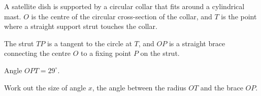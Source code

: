 \documentclass[11pt]{article}
\begin{document}
\begin{question}
\noindent A satellite dish is supported by a circular collar that fits around a cylindrical mast. $O$ is the centre of the circular cross-section of the collar, and $T$ is the point where a straight support strut touches the collar.

The strut $TP$ is a tangent to the circle at $T$, and $OP$ is a straight brace connecting the centre $O$ to a fixing point $P$ on the strut.

\begin{center}
\end{center}

\noindent Angle $OPT = 29^\circ$.

Work out the size of angle $x$, the angle between the radius $OT$ and the brace $OP$.
\vspace{4.5cm}
\end{question}
\end{document}
